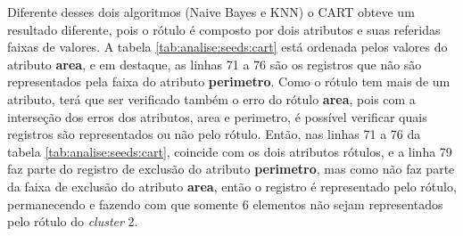 Diferente desses dois algoritmos (Naive Bayes e KNN) o CART obteve um resultado diferente, pois o rótulo é composto por dois atributos e suas referidas faixas de valores. A tabela \ref{tab:analise:seeds:cart} está ordenada pelos valores do atributo \textbf{area}, e em destaque, as linhas 71 a 76 são os registros que não são representados pela faixa do atributo \textbf{perimetro}.  Como o rótulo tem mais de um atributo, terá que ser verificado também o erro do rótulo \textbf{area}, pois com  a interseção dos erros dos atributos, area e perimetro, é possível verificar quais registros são representados ou não pelo rótulo. Então, nas linhas 71 a 76 da tabela \ref{tab:analise:seeds:cart}, coincide com os dois atributos rótulos, e a linha 79 faz parte do registro de exclusão do atributo \textbf{perimetro}, mas como não faz parte da faixa de exclusão do atributo \textbf{area}, então o registro é representado pelo rótulo, permanecendo e fazendo com que somente 6 elementos não sejam representados pelo rótulo do \textit{cluster} 2.

% 
% 


